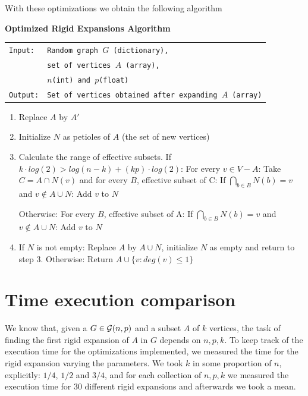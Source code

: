 With these optimizations we obtain the following algorithm

\begin{cajita}
\textbf{Optimized Rigid Expansions Algorithm} \hfill \break

\begin{tabular}{ l l }
\texttt{Input:} &  \texttt{Random graph $G$ (dictionary),} \\
                &  \texttt{set of vertices $A$ (array),} \\
                &  \texttt{$n$(int) and $p$(float)} \\
\texttt{Output:} & \texttt{Set of vertices obtained after expanding $A$ (array)} \\
\end{tabular}
\begin{enumerate}
\item Replace $A$ by $A'$
\item Initialize $N$ as petioles of $A$ (the set of new vertices)
\item Calculate the range of effective subsets.\hfill \break
If $k\cdot log(2) > log(n-k) + (kp)\cdot log(2)$: \hfill \break
\hphantom{12} For every $v\in V-A$:\hfill \break
\hphantom{1234} Take $C = A\cap N(v)$ and for every $B$, effective subset of C:\hfill \break
\hphantom{123456} If $\bigcap\limits_{b\in B} N(b) = v$ and $v\not\in A\cup N$: \hfill \break
\hphantom{12341234} Add $v$ to $N$

Otherwise:\hfill \break
\hphantom{12} For every $B$, effective subset of A:\hfill \break
\hphantom{1234} If $\bigcap\limits_{b\in B} N(b) = v$ and $v\not\in A\cup N$: \hfill \break
\hphantom{123456} Add $v$ to $N$

\item If $N$ is not empty: \hfill \break
\hphantom{12} Replace $A$ by $A\cup N$, initialize $N$ as empty and return to step 3. \hfill \break
      Otherwise:\hfill \break
\hphantom{12} Return $A\cup\{v: deg(v)\leq 1 \}$
\end{enumerate}
\end{cajita}

\section{Time execution comparison}
We know that, given a $G\in\mathcal{G}(n,p)$ and a subset $A$ of $k$ vertices, the task of finding the first rigid expansion of $A$ in $G$ depends on $n,p,k$. To keep track of the execution time for the optimizations implemented, we measured the time for the rigid expansion varying the parameters. We took $k$ in some proportion of $n$, explicitly: $1/4$, $1/2$ and $3/4$, and for each collection of $n,p,k$ we measured the execution time for 30 different rigid expansions and afterwards we took a mean.

